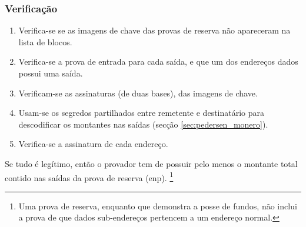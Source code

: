 
\subsubsection*{Verificação}

\begin{enumerate}
    \item Verifica-se se as imagens de chave das provas de reserva não apareceram na lista de blocos.
    \item Verifica-se a prova de entrada para cada saída, e que um dos endereços dados possui uma saída.
    \item Verificam-se as assinaturas (de duas bases), das imagens de chave.   
    \item Usam-se os segredos partilhados entre remetente e destinatário para descodificar os montantes nas saídas (secção \ref{sec:pedersen_monero}).  
    \item Verifica-se a assinatura de cada endereço.
\end{enumerate}{}

Se tudo é legítimo, então o provador tem de possuir pelo menos o montante total contido nas saídas da prova de reserva (enp). 
\footnote{Uma prova de reserva, enquanto que demonstra a posse de fundos, não inclui a prova de que dados sub-endereços pertencem a um endereço normal.}  


